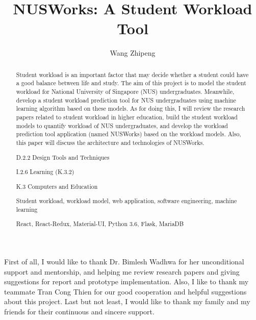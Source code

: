 \documentclass[fyp]{socreport}
\begin{document}
\title{NUSWorks: A Student Workload Tool}
\author{Wang Zhipeng}
\maketitle
\begin{abstract}
Student workload is an important factor that may decide whether a student could have a good balance between life and study. The aim of this project is to model the student workload for National University of Singapore (NUS) undergraduates. Meanwhile, develop a student workload prediction tool for NUS undergraduates using machine learning algorithm based on these models. As for doing this, I will review the research papers related to student workload in higher education, build the student workload models to quantify workload of NUS undergraduates, and develop the workload prediction tool application (named NUSWorks) based on the workload models. Also, this paper will discuss the architecture and technologies of NUSWorks.

\begin{descriptors}
	\item D.2.2 Design Tools and Techniques
  \item I.2.6 Learning (K.3.2)
	\item K.3 Computers and Education
\end{descriptors}
\begin{keywords}
	Student workload, workload model, web application, software engineering, machine learning
\end{keywords}
\begin{implement}
	React, React-Redux, Material-UI, Python 3.6, Flask, MariaDB
\end{implement}
\end{abstract}

\begin{acknowledgement}
First of all, I would like to thank Dr. Bimlesh Wadhwa for her unconditional support and mentorship, and helping me review research papers and giving suggestions for report and prototype implementation. Also, I like to thank my teammate Tran Cong Thien for our good cooperation and helpful suggestions about this project. Last but not least, I would like to thank my family and my friends for their continuous and sincere support.
\end{acknowledgement}
\end{document}
